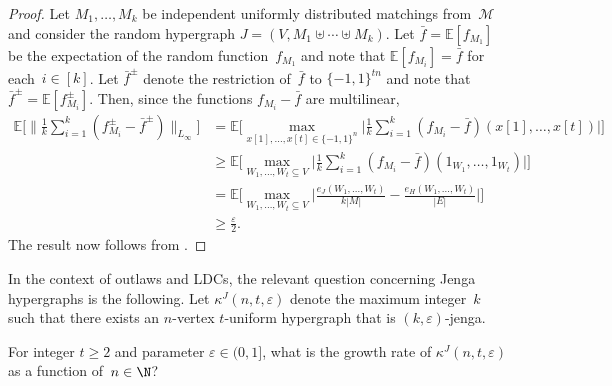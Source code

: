 \documentclass{toc}
\newcommand{\pmset}[1]{\{-1,1\}^{#1}} %
\newcommand{\Exp}{{\mathbb{E}}}
\newcommand{\eps}{\varepsilon}
\begin{document}
\begin{proof}
Let $M_1,\dots,M_k$ be independent uniformly distributed matchings from~$\mathcal M$ and consider the random  hypergraph $J = (V, M_1\uplus\cdots\uplus M_k)$.
Let $\bar f = \Exp[f_{M_1}]$ be the expectation of the random function~$f_{M_1}$ and note that $\Exp[f_{M_i}]  = \bar f$ for each~$i\in[k]$.
Let $\bar f^\pm$ denote the restriction of~$\bar f$ to $\pmset{tn}$ and note that $\bar f^\pm = \Exp[f_{M_i}^\pm]$.
Then, since the functions $f_{M_i} - \bar f$ are multilinear,
\begin{align*}
\Exp\Big[
\Big\|
\frac{1}{k}\sum_{i=1}^k (f_{M_i}^\pm - \bar f^\pm)
\Big\|_{L_\infty}
\Big] 
&=
\Exp\Big[
\max_{x[1],\dots,x[t]\in \pmset{n}}\Big|
\frac{1}{k}\sum_{i=1}^k (f_{M_i} - \bar f)(x[1],\dots,x[t])\Big|
\Big]\\ 
&\geq
\Exp\Big[
\max_{W_1,\dots,W_t\subseteq V}
\Big|
\frac{1}{k}\sum_{i=1}^k (f_{M_i} - \bar f)
(1_{W_1},\dots,1_{W_t})
\Big|
\Big]\\
&=
\Exp\Big[
\max_{W_1,\dots,W_t\subseteq V}
\Big|
\frac{e_J(W_1,\dots,W_t)}{k|M|}
-
\frac{e_H(W_1,\dots,W_t)}{|E|}\Big|
\Big]\\
&\geq
\frac{\eps}{2}.
\end{align*}
The result now follows from .
\end{proof}

In the context of outlaws and LDCs, the relevant question concerning Jenga hypergraphs is the following.
Let $\kappa^J(n,t,\eps)$ denote the maximum integer~$k$ such that there exists an $n$-vertex $t$-uniform hypergraph that is $(k,\eps)$-jenga.


\begin{question}\label{prob:jenga}
For integer $t \geq 2$ and parameter $\eps\in (0,1]$, what is the growth rate of $\kappa^J(n,t,\eps)$ as a function of~$n\in\N$?
\end{question}
\end{document}
